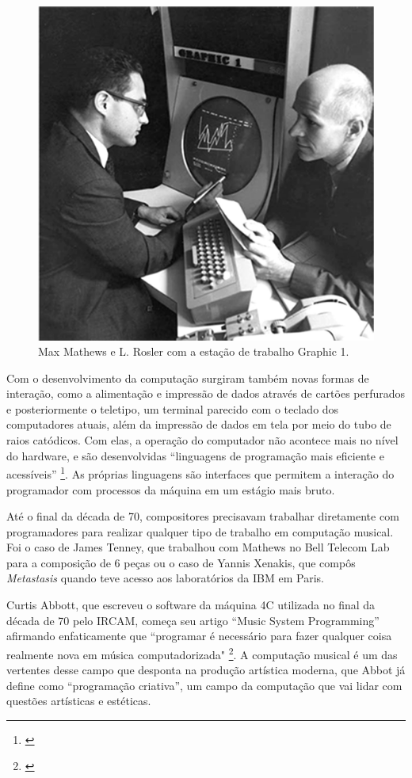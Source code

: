 \begin{figure}
    \caption{\label{max}Max Mathews e L. Rosler com a estação de trabalho Graphic 1. }
    
        \includegraphics[width=0.5\linewidth]{pictures/MaxHolmes-251}
    
\end{figure}

Com o desenvolvimento da computação surgiram também novas formas de interação, como a alimentação e impressão de dados através de cartões perfurados e posteriormente o teletipo, um terminal parecido com o teclado dos computadores atuais, além da impressão de dados em tela por meio do tubo de raios catódicos. Com elas, a operação do computador não acontece mais no nível do hardware, e são desenvolvidas ``linguagens de programação mais eficiente e acessíveis'' \footnote{\cite[111]{IAZZETTA1997}}. As próprias linguagens são interfaces que permitem a interação do programador com processos da máquina em um estágio mais bruto.

Até o final da década de 70, compositores precisavam trabalhar diretamente com programadores para realizar qualquer tipo de trabalho em computação musical. Foi o caso de James Tenney, que trabalhou com Mathews no Bell Telecom Lab para a composição de 6 peças ou o caso de Yannis Xenakis, que compôs \emph{Metastasis} quando teve acesso aos laboratórios da IBM em Paris\cite{Holmes1985}. 

Curtis Abbott, que escreveu o software da máquina 4C utilizada no final da década de 70 pelo IRCAM, começa seu artigo ``Music System Programming'' afirmando enfaticamente que ``programar é necessário para fazer qualquer coisa realmente nova em música computadorizada" \footnote{\cite[51]{Roads1996}}. A computação musical é um das vertentes desse campo que desponta na produção artística moderna, que Abbot já define como ``programação criativa'', um campo da computação que vai lidar com questões artísticas e estéticas. 

